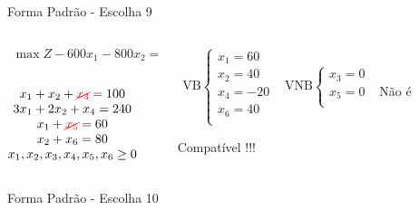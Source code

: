 \documentclass{beamer}
\begin{document}
\begin{frame}
{\begin{block}{Forma Padrão - {\color{cyan}Escolha 9}}
			\begin{columns}
				\begin{column}{0.35\textwidth}
					$
						\begin{matrix}
							\max Z - 600x_1 - 800x_2 = 0 \\
						\end{matrix}
					$ \\
					 \\
					$
						\begin{matrix}
							x_1  + x_2  + {\color{red}\cancel{x_3}}                   = 100 \\
							3x_1 + 2x_2       + x_4             = 240 \\
							x_1                     + {\color{red}\cancel{x_5}}       = 60 \\
							x_2                           + x_6 = 80 \\
							x_1,x_2, x_3, x_4, x_5, x_6 \ge 0 \\
						\end{matrix}
					$
				\end{column}
				\vline
				\hspace{0.1cm}
				\begin{column}{0.45\textwidth}
						$
							\begin{matrix}
								\text{VB} \left\{  \begin{matrix}
																 x_1 = 60 \\
																 x_2 = 40 \\
																 x_4 = -20 \\
																 x_6 = 40 \\
												   \end{matrix} 
										   \right.
								&
								\text{VNB} \left\{  \begin{matrix}
																 x_3 = 0 \\
																 x_5 = 0 \\
												   \end{matrix} 
										   \right. 
								\\
							 & \\
							\end{matrix}
						$
						{\color{red}Não é Compatível !!!}
				\end{column}
			\end{columns}
		\end{block}
	}
	{
		\begin{block}{Forma Padrão - {\color{cyan}Escolha 10}}

\end{block}}
\end{frame}
\end{document}
